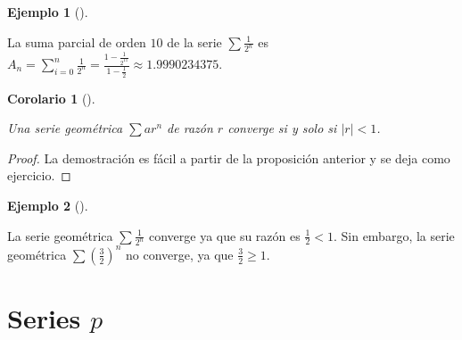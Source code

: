 \documentclass[
  a4paper,
]{scrreport}
\theoremstyle{definition}
\newtheorem{example}{Ejemplo}[chapter]
\theoremstyle{plain}
\newtheorem{corollary}{Corolario}[chapter]
\theoremstyle{definition}
\theoremstyle{definition}
\theoremstyle{plain}
\theoremstyle{plain}
\theoremstyle{remark}
\begin{document}
\begin{example}[]\protect\hypertarget{exm-suma-parcial-serie-geometrica}{}\label{exm-suma-parcial-serie-geometrica}

La suma parcial de orden \(10\) de la serie \(\sum \frac{1}{2^n}\) es
\(A_n = \sum_{i=0}^n \frac{1}{2^n} = \frac{1-\frac{1}{2^{11}}}{1-\frac{1}{2}} \approx 1.9990234375\).

\end{example}

\begin{corollary}[]\protect\hypertarget{cor-convergencia-series-geometricas}{}\label{cor-convergencia-series-geometricas}

Una serie geométrica \(\sum ar^n\) de razón \(r\) converge si y solo si
\(|r|<1\).

\end{corollary}

\begin{tcolorbox}[enhanced jigsaw, leftrule=.75mm, colbacktitle=quarto-callout-note-color!10!white, toprule=.15mm, opacityback=0, opacitybacktitle=0.6, toptitle=1mm, breakable, bottomtitle=1mm, colframe=quarto-callout-note-color-frame, rightrule=.15mm, titlerule=0mm, title=\textcolor{quarto-callout-note-color}{\faInfo}\hspace{0.5em}{Demostración}, arc=.35mm, left=2mm, bottomrule=.15mm, colback=white, coltitle=black]

\begin{proof}
La demostración es fácil a partir de la proposición anterior y se deja
como ejercicio.
\end{proof}

\end{tcolorbox}

\begin{example}[]\protect\hypertarget{exm-convergencia-series-geometricas}{}\label{exm-convergencia-series-geometricas}

La serie geométrica \(\sum \frac{1}{2^n}\) converge ya que su razón es
\(\frac{1}{2}<1\). Sin embargo, la serie geométrica
\(\sum \left(\frac{3}{2}\right)^n\) no converge, ya que
\(\frac{3}{2}\geq 1\).

\end{example}

\section{\texorpdfstring{Series \(p\)}{Series p}}\label{series-p}
\end{document}
